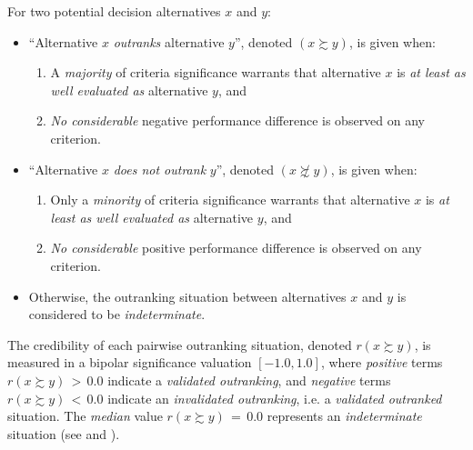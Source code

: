 \begin{definition}\label{def:outranking}

\noindent For two potential decision alternatives $x$ and $y$:
\begin{itemize}[leftmargin=0.5cm,rightmargin=0.5cm]
\item ``Alternative $x$ \emph{outranks} alternative $y$'', denoted $(x \succsim y)$, is given when:
   \begin{enumerate}[nosep]
     \item A \emph{majority} of criteria significance warrants that alternative $x$ is \emph{at least as well evaluated as} alternative $y$, and
     \item \emph{No considerable} negative performance difference is observed on any criterion.      
    \end{enumerate}
\item ``Alternative $x$ \emph{does not outrank} $y$'', denoted $(x \not\succsim y)$, is given when:
   \begin{enumerate}[nosep]
    \item Only a \emph{minority} of criteria significance warrants that alternative $x$ is \emph{at least as well evaluated as} alternative $y$, and
    \item \emph{No considerable} positive performance difference is observed on any criterion. 
    \end{enumerate}
\item Otherwise, the outranking situation between alternatives $x$ and $y$ is considered to be \emph{indeterminate}.
\end{itemize}
\end{definition}

The credibility of each pairwise outranking situation, denoted $r(x \succsim y)$, is measured in a bipolar significance valuation $[-1.0, 1.0]$, where \emph{positive} terms $r(x \succsim y)\, >\, 0.0$ indicate a \emph{validated outranking}, and \emph{negative} terms $r(x \succsim y)\, <\, 0.0$ indicate an \emph{invalidated outranking}, i.e. a \emph{validated outranked} situation. The \emph{median} value $r(x \succsim y)\, = \,0.0$ represents an \emph{indeterminate} situation (see \citealp{BIS-2004a} and \citealp{BIS-2013}).   

